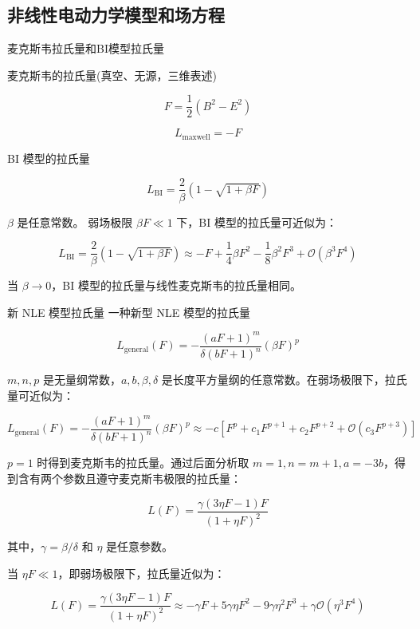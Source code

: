 \documentclass[9pt, dvipsnames]{beamer} %
\begin{document}
\subsection{非线性电动力学模型和场方程}

\begin{frame}{麦克斯韦拉氏量和BI模型拉氏量}

麦克斯韦的拉氏量(真空、无源，三维表述)

$$
F
=\frac{1 }{2 } (B^2-E^2)
$$

$$
L_{\mathrm{maxwell}}
=-F
$$

BI 模型的拉氏量

$$
L_{\mathrm{BI}}
=\frac{2 }{\beta } \left(1-\sqrt{1+\beta F} \right) 
$$

$\beta $ 是任意常数。   弱场极限 $\beta F\ll 1 $ 下，BI 模型的拉氏量可近似为：

$$
L_{\mathrm{BI}}
=\frac{2 }{\beta } \left(1-\sqrt{1+\beta F} \right)
\approx -F + \frac{1 }{4 } \beta F^2 - \frac{1 }{8 } \beta^2 F^3 +\mathcal{O}\left(\beta^3 F^4 \right) 
$$

当 $\beta\to 0 $，BI 模型的拉氏量与线性麦克斯韦的拉氏量相同。

\end{frame}

\begin{frame}{新 NLE 模型拉氏量}
一种新型 NLE 模型的拉氏量

$$
L_{\mathrm{general}}(F)
=-\frac{\left(aF+1 \right)^m }{\delta(bF+1)^n } \left(\beta F \right)^p
$$

$m,n,p $ 是无量纲常数，$a,b,\beta,\delta $ 是长度平方量纲的任意常数。在弱场极限下，拉氏量可近似为：

$$
L_{\mathrm{general}}(F)
=-\frac{\left(aF+1 \right)^m }{\delta(bF+1)^n } \left(\beta F \right)^p
\approx -c\left[F^p + c_1 F^{p+1} +c_2 F^{p+2}  + \mathcal{O}\left(c_3 F^{p+3} \right) \right]
$$

$p=1 $ 时得到麦克斯韦的拉氏量。通过后面分析取 $m=1,n=m+1,a=-3b $，得到含有两个参数且遵守麦克斯韦极限的拉氏量：

$$
\boxed{
L(F)
=\frac{\gamma(3\eta F - 1 )F }{(1+\eta F)^2 }
}
$$

其中，$\gamma=\beta/\delta $ 和 $\eta $ 是任意参数。

当 $\eta F\ll 1 $，即弱场极限下，拉氏量近似为：

$$
L(F)
=\frac{\gamma(3\eta F - 1 )F }{(1+\eta F)^2 } 
\approx -\gamma F + 5\gamma \eta F^2 -9\gamma \eta^2 F^3 + \gamma\mathcal{O}\left(\eta^3F^4 \right) 
$$

\end{frame}
\end{document}
